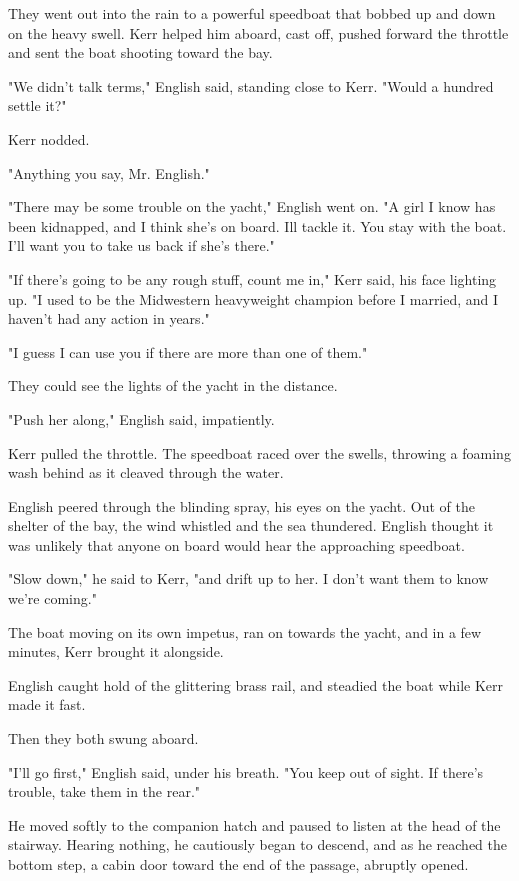 \documentclass{novel}
\begin{document}
They went out into the rain to a powerful speedboat that bobbed up and down on the heavy swell. Kerr helped him aboard, cast off, pushed forward the throttle and sent the boat shooting toward the bay.

"We didn't talk terms," English said, standing close to Kerr. "Would a hundred settle it?"

Kerr nodded.

"Anything you say, Mr. English."

"There may be some trouble on the yacht," English went on. "A girl I know has been kidnapped, and I think she's on board. Ill tackle it. You stay with the boat. I'll want you to take us back if she's there."

"If there's going to be any rough stuff, count me in," Kerr said, his face lighting up. "I used to be the Midwestern heavyweight champion before I married, and I haven't had any action in years."

"I guess I can use you if there are more than one of them."

They could see the lights of the yacht in the distance.

"Push her along," English said, impatiently.

Kerr pulled the throttle. The speedboat raced over the swells, throwing a foaming wash behind as it cleaved through the water.

English peered through the blinding spray, his eyes on the yacht. Out of the shelter of the bay, the wind whistled and the sea thundered. English thought it was unlikely that anyone on board would hear the approaching speedboat.

"Slow down," he said to Kerr, "and drift up to her. I don't want them to know we're coming."

The boat moving on its own impetus, ran on towards the yacht, and in a few minutes, Kerr brought it alongside.

English caught hold of the glittering brass rail, and steadied the boat while Kerr made it fast.

Then they both swung aboard.

"I'll go first," English said, under his breath. "You keep out of sight. If there's trouble, take them in the rear."

He moved softly to the companion hatch and paused to listen at the head of the stairway. Hearing nothing, he cautiously began to descend, and as he reached the bottom step, a cabin door toward the end of the passage, abruptly opened.
\end{document}

